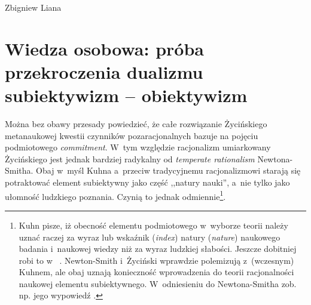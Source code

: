\begin{artplenv}{Zbigniew Liana}
\section{Wiedza osobowa: próba przekroczenia dualizmu subiektywizm -- obiektywizm}
Można bez obawy przesady powiedzieć, że całe rozwiązanie Życińskiego metanaukowej kwestii czynników pozaracjonalnych bazuje na pojęciu podmiotowego \textit{commitment}. W~tym względzie racjonalizm umiarkowany Życińskiego jest jednak bardziej radykalny od \textit{temperate rationalism} Newtona-Smitha. Obaj w~myśl Kuhna a~przeciw tradycyjnemu racjonalizmowi starają się potraktować element subiektywny jako część ,,natury nauki'', a~nie tylko jako ułomność ludzkiego poznania. Czynią to jednak odmiennie\footnote{Kuhn
\parencites*[][s.~151]{kuhn_structure_1970_liana}[por.][s.~263]{kuhn_struktura_2001} %
 pisze, iż obecność elementu podmiotowego w~wyborze teorii należy uznać raczej za wyraz lub wskaźnik (\textit{index}) natury (\textit{nature}) naukowego badania i~naukowej wiedzy niż za wyraz ludzkiej słabości. Jeszcze dobitniej robi to w~
\parencites[][s.~325n]{kuhn_objectivity_1977}[por.][s.~447]{kuhn_obiektywnosc_1985}. %
 Newton-Smith i~Życiński wprawdzie polemizują z~(wczesnym) Kuhnem, ale obaj uznają konieczność wprowadzenia do teorii racjonalności naukowej elementu subiektywnego. W~odniesieniu do Newtona-Smitha zob. np. jego wypowiedź 
\parencite[][s.~270]{newton-smith_rationality_1981}.%
}.


\end{artplenv}
